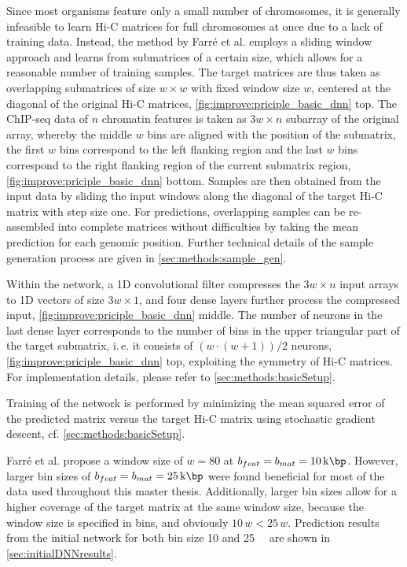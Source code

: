 Since most organisms feature only a small number of chromosomes, 
it is generally infeasible to learn Hi-C matrices for full chromosomes at once due to a lack of training data.
Instead, the method by Farr\'e et al. employs a sliding window approach and learns from submatrices of a certain size, 
which allows for a reasonable number of training samples.
The target matrices are thus taken as overlapping submatrices of size $w \times w$ 
with fixed window size $w$, centered at the diagonal of the 
original Hi-C matrices, \cref{fig:improve:priciple_basic_dnn} top.
The ChIP-seq data of $n$ chromatin features is taken as $3w \times n$ subarray of the original array,
whereby the middle $w$ bins are aligned with the position of the submatrix,
the first $w$ bins correspond to the left flanking region and the last $w$ bins correspond to 
the right flanking region of the current submatrix region, \cref{fig:improve:priciple_basic_dnn} bottom. 
Samples are then obtained from the input data by sliding 
the input windows along the diagonal of the target Hi-C matrix with step size one. 
For predictions, overlapping samples can be re-assembled into complete matrices without difficulties
by taking the mean prediction for each genomic position.
Further technical details of the sample generation process are given in \cref{sec:methods:sample_gen}.

Within the network, a 1D convolutional filter compresses the $3w \times n$ input arrays to 1D vectors
of size $3w \times 1$, and four dense layers further process the compressed input, \cref{fig:improve:priciple_basic_dnn} middle.
The number of neurons in the last dense layer corresponds to the number of bins
in the upper triangular part of the target submatrix, i.\,e. it consists of $(w \cdot (w+1))/2$ neurons, \cref{fig:improve:priciple_basic_dnn} top, 
exploiting the symmetry of Hi-C matrices. 
For implementation details, please refer to \cref{sec:methods:basicSetup}.

Training of the network is performed by minimizing the mean squared error of the predicted matrix
versus the target Hi-C matrix using stochastic gradient descent, cf. \cref{sec:methods:basicSetup}.

Farr\'e et al. propose a window size of $w=80$ at $b_{feat} = b_{mat} = \SI{10}{\kilo\bp}$.
However, larger bin sizes of $b_{feat} = b_{mat} = \SI{25}{\kilo\bp}$ were found beneficial for 
most of the data used throughout this master thesis.
Additionally, larger bin sizes allow for a higher coverage of the target matrix at the same window size,
because the window size is specified in bins, and obviously $10\, w < 25\, w$.
Prediction results from the initial network for both bin size 10 and \SI{25}{\kilo\bp} are shown in \cref{sec:initialDNNresults}.

